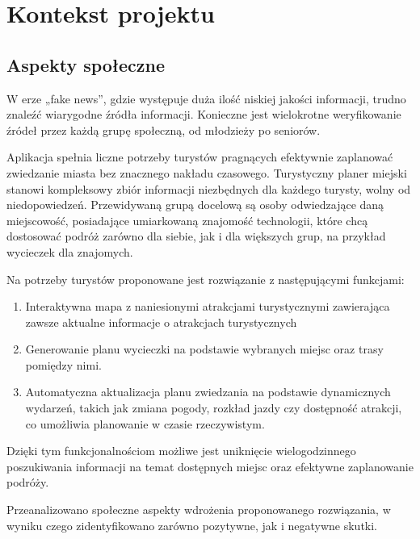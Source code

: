 
\chapter{Kontekst projektu}
\label{ch:kontekst-projektu}

\section{Aspekty społeczne}
\label{sec:aspekty-spoleczne}

W erze „fake news”, gdzie występuje duża ilość niskiej jakości informacji, trudno znaleźć wiarygodne źródła informacji.
Konieczne jest wielokrotne weryfikowanie źródeł przez każdą grupę społeczną, od młodzieży po seniorów.

\indent Aplikacja spełnia liczne potrzeby turystów pragnących efektywnie zaplanować zwiedzanie miasta bez znacznego nakładu czasowego.
Turystyczny planer miejski stanowi kompleksowy zbiór informacji niezbędnych dla każdego turysty, wolny od niedopowiedzeń.
Przewidywaną grupą docelową są osoby odwiedzające daną miejscowość, posiadające umiarkowaną znajomość technologii, które chcą dostosować podróż zarówno dla siebie, jak i dla większych grup, na przykład wycieczek dla znajomych.

\indent Na potrzeby turystów proponowane jest rozwiązanie z następującymi funkcjami:

\begin{enumerate}
    \item Interaktywna mapa z naniesionymi atrakcjami turystycznymi zawierająca zawsze aktualne informacje o atrakcjach turystycznych
    \item Generowanie planu wycieczki na podstawie wybranych miejsc oraz trasy pomiędzy nimi.
    \item Automatyczna aktualizacja planu zwiedzania na podstawie dynamicznych wydarzeń, takich jak zmiana pogody, rozkład jazdy czy dostępność atrakcji, co umożliwia planowanie w czasie rzeczywistym.
\end{enumerate}

Dzięki tym funkcjonalnościom możliwe jest uniknięcie wielogodzinnego poszukiwania informacji na temat dostępnych miejsc oraz efektywne zaplanowanie podróży.

\indent Przeanalizowano społeczne aspekty wdrożenia proponowanego rozwiązania, w wyniku czego zidentyfikowano zarówno pozytywne, jak i negatywne skutki.

